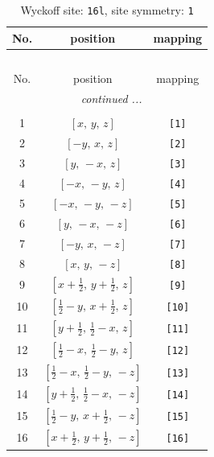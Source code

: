 \documentclass[fleqn,8pt]{jsarticle}
\begin{document}
\begin{longtable}{ccc}
\caption{Wyckoff site: {\tt 16l}, site symmetry: {\tt 1}}
 \\
 \hline \hline
No. & position & mapping \\ \hline \endfirsthead

\multicolumn{2}{l}{\tablename\ \thetable{}} \\
 \hline \hline
No. & position & mapping \\ \hline \endhead

 \hline \hline
\multicolumn{2}{r}{\footnotesize\it continued ...} \\ \endfoot

 \hline \hline
\multicolumn{2}{r}{} \\ \endlastfoot

1 & $\left[ x,\, y,\, z \right]$ & {\tt [1]} \\ \hline
2 & $\left[ - y,\, x,\, z \right]$ & {\tt [2]} \\ \hline
3 & $\left[ y,\, - x,\, z \right]$ & {\tt [3]} \\ \hline
4 & $\left[ - x,\, - y,\, z \right]$ & {\tt [4]} \\ \hline
5 & $\left[ - x,\, - y,\, - z \right]$ & {\tt [5]} \\ \hline
6 & $\left[ y,\, - x,\, - z \right]$ & {\tt [6]} \\ \hline
7 & $\left[ - y,\, x,\, - z \right]$ & {\tt [7]} \\ \hline
8 & $\left[ x,\, y,\, - z \right]$ & {\tt [8]} \\ \hline
9 & $\left[ x + \frac{1}{2},\, y + \frac{1}{2},\, z \right]$ & {\tt [9]} \\ \hline
10 & $\left[ \frac{1}{2} - y,\, x + \frac{1}{2},\, z \right]$ & {\tt [10]} \\ \hline
11 & $\left[ y + \frac{1}{2},\, \frac{1}{2} - x,\, z \right]$ & {\tt [11]} \\ \hline
12 & $\left[ \frac{1}{2} - x,\, \frac{1}{2} - y,\, z \right]$ & {\tt [12]} \\ \hline
13 & $\left[ \frac{1}{2} - x,\, \frac{1}{2} - y,\, - z \right]$ & {\tt [13]} \\ \hline
14 & $\left[ y + \frac{1}{2},\, \frac{1}{2} - x,\, - z \right]$ & {\tt [14]} \\ \hline
15 & $\left[ \frac{1}{2} - y,\, x + \frac{1}{2},\, - z \right]$ & {\tt [15]} \\ \hline
16 & $\left[ x + \frac{1}{2},\, y + \frac{1}{2},\, - z \right]$ & {\tt [16]} \\
\end{longtable}
\end{document}
